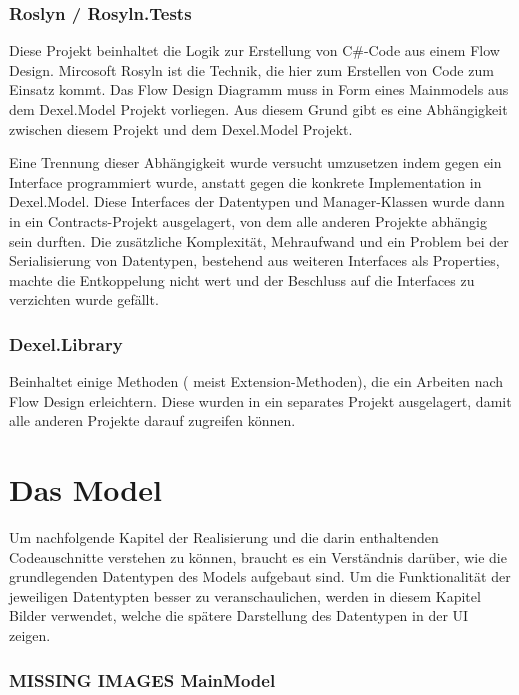 \subsubsection{Roslyn / Rosyln.Tests}

Diese Projekt beinhaltet die Logik zur Erstellung von C\#-Code aus einem Flow
Design. Mircosoft Rosyln ist die Technik, die hier zum Erstellen von Code zum
Einsatz kommt.
Das Flow Design Diagramm muss in Form eines Mainmodels aus dem
Dexel.Model Projekt vorliegen. Aus diesem Grund gibt es eine Abhängigkeit
zwischen diesem Projekt und dem Dexel.Model Projekt. 

Eine Trennung dieser Abhängigkeit wurde versucht umzusetzen indem gegen ein Interface
programmiert wurde, anstatt gegen die konkrete Implementation in
Dexel.Model. Diese Interfaces der Datentypen und Manager-Klassen wurde dann
in ein Contracts-Projekt ausgelagert, von dem alle anderen Projekte abhängig
sein durften. Die zusätzliche Komplexität, Mehraufwand und ein Problem bei
der Serialisierung von Datentypen, bestehend aus weiteren Interfaces als
Properties, machte die Entkoppelung nicht wert und der Beschluss auf die
Interfaces zu verzichten wurde gefällt.

\subsubsection{Dexel.Library}

Beinhaltet einige Methoden ( meist Extension-Methoden), die ein Arbeiten
nach Flow Design erleichtern. Diese wurden in ein separates Projekt
ausgelagert, damit alle anderen Projekte darauf zugreifen können.

\section{Das Model}

Um nachfolgende Kapitel der Realisierung und die darin enthaltenden
Codeauschnitte verstehen zu können, braucht es ein Verständnis darüber, wie die
grundlegenden Datentypen des Models aufgebaut sind. Um die Funktionalität der
jeweiligen Datentypten besser zu veranschaulichen, werden in diesem Kapitel
Bilder verwendet, welche die spätere Darstellung des Datentypen in der UI zeigen.

\subsubsection{{\bfseries\sffamily MISSING IMAGES} MainModel}

